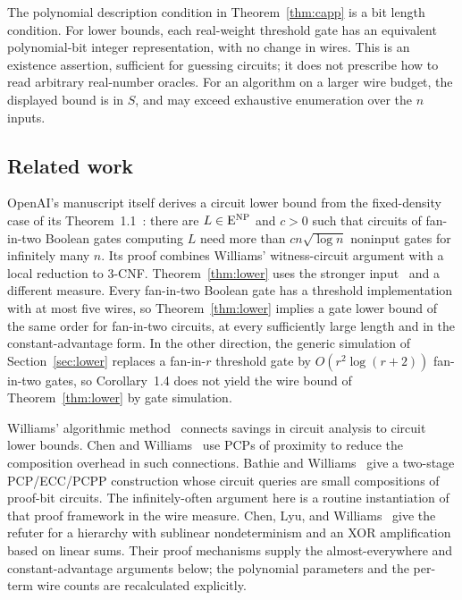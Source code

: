 The polynomial description condition in Theorem~\ref{thm:capp} is a bit
length condition. For lower bounds, each real-weight threshold gate has
an equivalent polynomial-bit integer representation, with no change
in wires. This is an existence assertion, sufficient for guessing
circuits; it does not prescribe how to read arbitrary real-number
oracles. For an algorithm on a larger wire budget, the displayed bound
is in $S$, and may exceed exhaustive enumeration over the $n$ inputs.

\subsection{Related work}

OpenAI's manuscript itself derives a circuit lower bound from the
fixed-density case of its Theorem~1.1~\cite[Corollary~1.4]{OpenAI26}:
there are $L\in\mathrm{E}^{\mathrm{NP}}$ and $c>0$ such that circuits of fan-in-two Boolean
gates computing $L$ need more than $cn\sqrt{\log n}$ noninput gates for
infinitely many $n$. Its proof combines Williams' witness-circuit
argument with a local reduction to 3-CNF. Theorem~\ref{thm:lower} uses the
stronger input \HTC\ and a different measure. Every fan-in-two Boolean
gate has a threshold implementation with at most five wires, so
Theorem~\ref{thm:lower} implies a gate lower bound of the same order for
fan-in-two circuits, at every sufficiently large length and in the
constant-advantage form. In the other direction, the generic simulation
of Section~\ref{sec:lower} replaces a fan-in-$r$ threshold gate by
$O(r^2\log(r+2))$ fan-in-two gates, so Corollary~1.4 does not yield the
wire bound of Theorem~\ref{thm:lower} by gate simulation.

Williams' algorithmic method~\cite{Williams13} connects savings in
circuit analysis to circuit lower bounds. Chen and Williams~\cite{CW19}
use PCPs of proximity to reduce the composition overhead in such
connections. Bathie and Williams~\cite[Section 3.2--3.3]{BW24} give a
two-stage PCP/ECC/PCPP construction whose circuit queries are small
compositions of proof-bit circuits. The infinitely-often argument here
is a routine instantiation of that proof framework in the wire measure.
Chen, Lyu, and Williams~\cite{CLW20} give the refuter for a hierarchy
with sublinear nondeterminism and an XOR amplification based on linear
sums. Their proof mechanisms supply the almost-everywhere and
constant-advantage arguments below; the polynomial parameters and the
per-term wire counts are recalculated explicitly.

